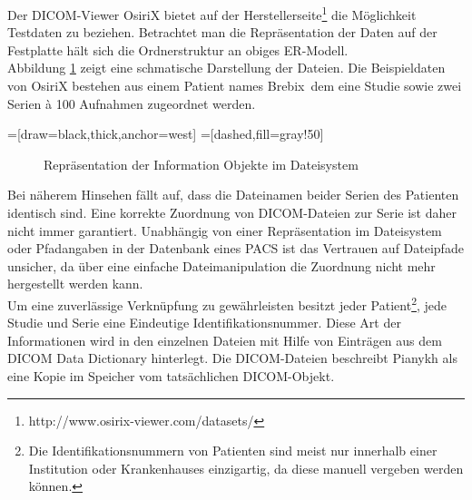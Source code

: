 Der DICOM-Viewer OsiriX bietet auf der Herstellerseite\footnote{http://www.osirix-viewer.com/datasets/} die Möglichkeit Testdaten zu beziehen. Betrachtet man die Repräsentation der Daten auf der Festplatte hält sich die Ordnerstruktur an obiges ER-Modell.\\
Abbildung \ref{filesystemrep} zeigt eine schmatische Darstellung der Dateien. Die Beispieldaten von OsiriX bestehen aus einem Patient names \glqq Brebix\grqq\, dem eine Studie sowie zwei Serien à 100 Aufnahmen zugeordnet werden.

=[draw=black,thick,anchor=west]
=[dashed,fill=gray!50]
\begin{figure}[htbp]
\centering
\caption{Repräsentation der Information Objekte im Dateisystem}
\label{filesystemrep}
\end{figure}

Bei näherem Hinsehen fällt auf, dass die Dateinamen beider Serien des Patienten identisch sind. Eine korrekte Zuordnung von DICOM-Dateien zur Serie ist daher nicht immer garantiert. Unabhängig von einer Repräsentation im Dateisystem oder Pfadangaben in der Datenbank eines PACS ist das Vertrauen auf Dateipfade unsicher, da über eine einfache Dateimanipulation die Zuordnung nicht mehr hergestellt werden kann.\\
Um eine zuverlässige Verknüpfung zu gewährleisten besitzt jeder Patient\footnote{Die Identifikationsnummern von Patienten sind meist nur innerhalb einer Institution oder Krankenhauses einzigartig, da diese manuell vergeben werden können\cite[5.6.2]{pianykh:dicom}.}, jede Studie und Serie eine Eindeutige Identifikationsnummer. Diese Art der Informationen wird in den einzelnen Dateien mit Hilfe von Einträgen aus dem DICOM Data Dictionary\cite{dicom:dd} hinterlegt. Die DICOM-Dateien beschreibt Pianykh \cite[S. 47]{pianykh:dicom}
als eine Kopie im Speicher vom tatsächlichen DICOM-Objekt.

